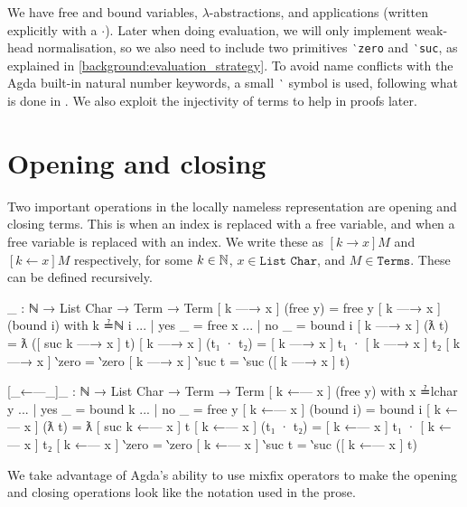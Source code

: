 We have free and bound variables, $\lambda$-abstractions, and applications (written explicitly with
a $\cdot$). Later when doing evaluation, we will only implement weak-head normalisation, so we also
need to include two primitives \texttt{‵zero} and \texttt{‵suc}, as explained in
\ref{background:evaluation_strategy}. To avoid name conflicts with the Agda built-in natural number
keywords, a small \texttt{‵} symbol is used, following what is done in
\citet{wadler_programming_2022}. We also exploit the injectivity of terms to help in proofs later.

\section{Opening and closing}
\label{appendix:opening_and_closing}
Two important operations in the locally nameless representation are
opening and closing terms. This is when an index is replaced with a free variable, and when a free
variable is replaced with an index. We write these as $[k \to x] M$ and $[k \leftarrow x] M$
respectively, for some $k \in \operatorname{\mathbb{N}}$, $x \in \texttt{List Char}$, and $M \in \texttt{Terms}$. These
can be defined recursively.
\begin{code}
  [_—→_]_ : ℕ → List Char → Term → Term
  [ k —→ x ] (free y) = free y
  [ k —→ x ] (bound i) with k ≟ℕ i
  ... | yes _ = free x
  ... | no  _ = bound i
  [ k —→ x ] (ƛ t) = ƛ ([ suc k —→ x ] t)
  [ k —→ x ] (t₁ · t₂) = [ k —→ x ] t₁ · [ k —→ x ] t₂
  [ k —→ x ] ‵zero = ‵zero
  [ k —→ x ] ‵suc t = ‵suc ([ k —→ x ] t)

  [_←—_]_ : ℕ → List Char → Term → Term
  [ k ←— x ] (free y) with x ≟lchar y
  ... | yes _ = bound k
  ... | no  _ = free y
  [ k ←— x ] (bound i) = bound i
  [ k ←— x ] (ƛ t) = ƛ [ suc k ←— x ] t
  [ k ←— x ] (t₁ · t₂) = [ k ←— x ] t₁ · [ k ←— x ] t₂
  [ k ←— x ] ‵zero = ‵zero
  [ k ←— x ] ‵suc t = ‵suc ([ k ←— x ] t)
\end{code}
We take advantage of Agda's ability to use mixfix operators to make the opening and closing
operations look like the notation used in the prose.

